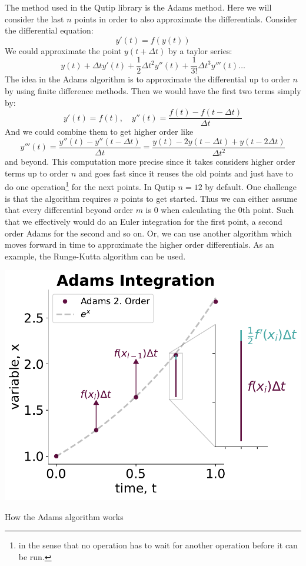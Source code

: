 The method used in the Qutip library \cite{johannson_qutip} is the Adams method. Here we will consider the last $n$ points in order to also approximate the differentials. Consider the differential equation:
\begin{equation}
    y'(t) = f(y(t))
\end{equation}
We could approximate the point $y(t+\Delta t)$ by a taylor series:
\begin{equation}
    y(t) + \Delta t y'(t) + \frac12 \Delta t^2 y''(t) + \frac{1}{3!} \Delta t^3 y'''(t)\dots 
\end{equation}
The idea in the Adams algorithm is to approximate the differential up to order $n$ by using finite difference methods. Then we would have the first two terms simply by:
\begin{equation}
    y'(t) = f(t), \quad y''(t) = \frac{f(t) - f(t - \Delta t)}{\Delta t} 
\end{equation}
And we could combine them to get higher order like
\begin{equation}
    y'''(t) = \frac{y''(t) - y''(t-\Delta t)}{\Delta t} = \frac{y(t) - 2y(t-\Delta t) + y(t-2\Delta t)}{\Delta t^2}
\end{equation}
and beyond. This computation more precise since it takes considers higher order terms up to order $n$ and goes fast since it reuses the old points and just have to do one operation\footnote{in the sense that no operation has to wait for another operation before it can be run.} for the next points. In Qutip $n=12$ by default. One challenge is that the algorithm requires $n$ points to get started. Thus we can either assume that every differential beyond order $m$ is $0$ when calculating the $0$th point. Such that we effectively would do an Euler integration for the first point, a second order Adams for the second and so on. Or, we can use another algorithm which moves forward in time to approximate the higher order differentials. As an example, the Runge-Kutta algorithm can be used.



\begin{marginfigure}
    \centering
    \includegraphics[]{Figs/Theory/adams_intergation.pdf}
    \caption{How the Adams algorithm works}
    \label{fig:Adams integration}
\end{marginfigure}

